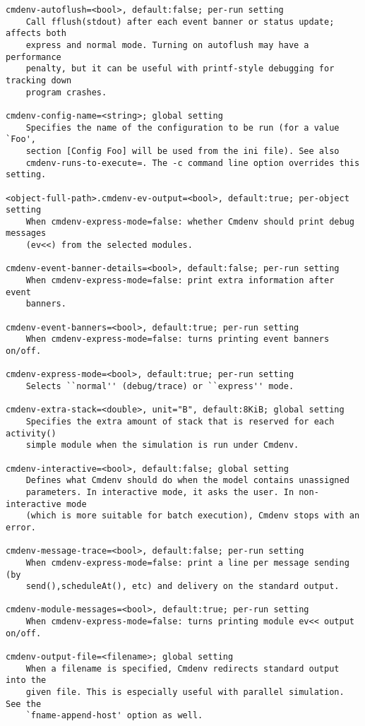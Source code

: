 \begin{verbatim}
cmdenv-autoflush=<bool>, default:false; per-run setting
    Call fflush(stdout) after each event banner or status update; affects both
    express and normal mode. Turning on autoflush may have a performance
    penalty, but it can be useful with printf-style debugging for tracking down
    program crashes.

cmdenv-config-name=<string>; global setting
    Specifies the name of the configuration to be run (for a value `Foo',
    section [Config Foo] will be used from the ini file). See also
    cmdenv-runs-to-execute=. The -c command line option overrides this setting.

<object-full-path>.cmdenv-ev-output=<bool>, default:true; per-object setting
    When cmdenv-express-mode=false: whether Cmdenv should print debug messages
    (ev<<) from the selected modules.

cmdenv-event-banner-details=<bool>, default:false; per-run setting
    When cmdenv-express-mode=false: print extra information after event
    banners.

cmdenv-event-banners=<bool>, default:true; per-run setting
    When cmdenv-express-mode=false: turns printing event banners on/off.

cmdenv-express-mode=<bool>, default:true; per-run setting
    Selects ``normal'' (debug/trace) or ``express'' mode.

cmdenv-extra-stack=<double>, unit="B", default:8KiB; global setting
    Specifies the extra amount of stack that is reserved for each activity()
    simple module when the simulation is run under Cmdenv.

cmdenv-interactive=<bool>, default:false; global setting
    Defines what Cmdenv should do when the model contains unassigned
    parameters. In interactive mode, it asks the user. In non-interactive mode
    (which is more suitable for batch execution), Cmdenv stops with an error.

cmdenv-message-trace=<bool>, default:false; per-run setting
    When cmdenv-express-mode=false: print a line per message sending (by
    send(),scheduleAt(), etc) and delivery on the standard output.

cmdenv-module-messages=<bool>, default:true; per-run setting
    When cmdenv-express-mode=false: turns printing module ev<< output on/off.

cmdenv-output-file=<filename>; global setting
    When a filename is specified, Cmdenv redirects standard output into the
    given file. This is especially useful with parallel simulation. See the
    `fname-append-host' option as well.


\end{verbatim}
